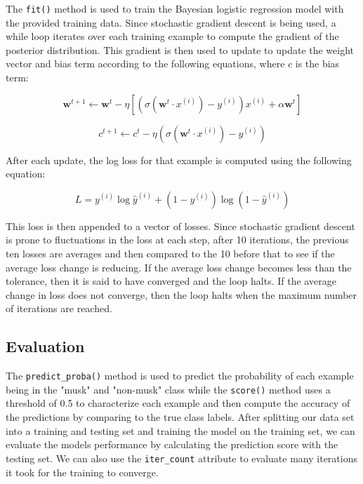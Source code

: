 \documentclass[12pt]{article}
\begin{document}
The \texttt{fit()} method is used to train the Bayesian logistic regression model with the provided training data. Since stochastic gradient descent is being used, a while loop iterates over each training example to compute the gradient of the posterior distribution. This gradient is then used to update to update the weight vector and bias term according to the following equations, where $c$ is the bias term:

\begin{equation}
\mathbf{w}^{t+1} \leftarrow \mathbf{w}^{t} - \eta \left[ \left(\sigma(\mathbf{w}^t \cdot x^{(i)}) - y^{(i)}\right) x^{(i)} + \alpha \mathbf{w}^{t} \right]
\end{equation}

\begin{equation}
c^{t+1} \leftarrow c^{t} - \eta (\sigma(\mathbf{w}^t \cdot x^{(i)}) - y^{(i)})
\end{equation}

After each update, the log loss for that example is computed using the following equation:

\begin{equation}
L = y^{(i)} \log \hat{y}^{(i)}+ (1-y^{(i)})\log(1-\hat{y}^{(i)})
\end{equation}

This loss is then appended to a vector of losses. Since stochastic gradient descent is prone to fluctuations in the loss at each step, after 10 iterations, the previous ten losses are averages and then compared to the 10 before that to see if the average loss change is reducing. If the average loss change becomes less than the tolerance, then it is said to have converged and the loop halts. If the average change in loss does not converge, then the loop halts when the maximum number of iterations are reached.

\subsection{Evaluation}

The \texttt{predict\_proba()} method is used to predict the probability of each example being in the "musk" and "non-musk" class while the \texttt{score()} method uses a threshold of 0.5 to characterize each example and then compute the accuracy of the predictions by comparing to the true class labels. After splitting our data set into a training and testing set and training the model on the training set, we can evaluate the models performance by calculating the prediction score with the testing set. We can also use the \texttt{iter\_count} attribute to evaluate many iterations it took for the training to converge.
\end{document}
